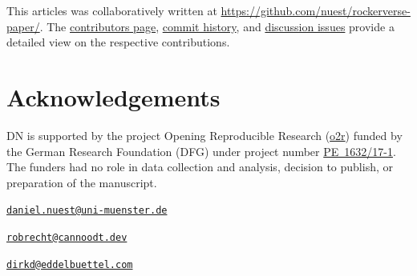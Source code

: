 This articles was collaboratively written at
\href{https://github.com/nuest/rockerverse-paper/}{https://github.com/nuest/rockerverse-paper/}.
The
\href{https://github.com/nuest/rockerverse-paper/graphs/contributors}{contributors page},
\href{https://github.com/nuest/rockerverse-paper/commits/master}{commit history},
and
\href{https://github.com/nuest/rockerverse-paper/issues/}{discussion issues}
provide a detailed view on the respective contributions.

\hypertarget{acknowledgements}{%
\section{Acknowledgements}\label{acknowledgements}}

DN is supported by the project Opening Reproducible Research
(\href{https://www.uni-muenster.de/forschungaz/project/12343}{o2r})
funded by the German Research Foundation (DFG) under project number
\href{https://gepris.dfg.de/gepris/projekt/415851837}{PE~1632/17-1}. The
funders had no role in data collection and analysis, decision to
publish, or preparation of the manuscript.




\address{%
Daniel Nüst\\
University of Münster\\
Institute for Geoinformatics\\ Heisenbergstr. 2\\ 48149 Münster, Germany\\ \\
}
\href{mailto:daniel.nuest@uni-muenster.de}{\nolinkurl{daniel.nuest@uni-muenster.de}}

\address{%
Robrecht Cannoodt\\
Ghent University\\
Data Mining and Modelling for Biomedicine group\\ VIB Center for Inflammation Research\\ Technologiepark 71\\ 9052 Ghent, Belgium\\ \\
}
\href{mailto:robrecht@cannoodt.dev}{\nolinkurl{robrecht@cannoodt.dev}}

\address{%
Dirk Eddelbuettel\\
University of Illinois at Urbana-Champaign\\
Department of Statistics\\ Illini Hall, 725 S Wright St\\ Champaign, IL 61820, USA\\ \\
}
\href{mailto:dirkd@eddelbuettel.com}{\nolinkurl{dirkd@eddelbuettel.com}}

